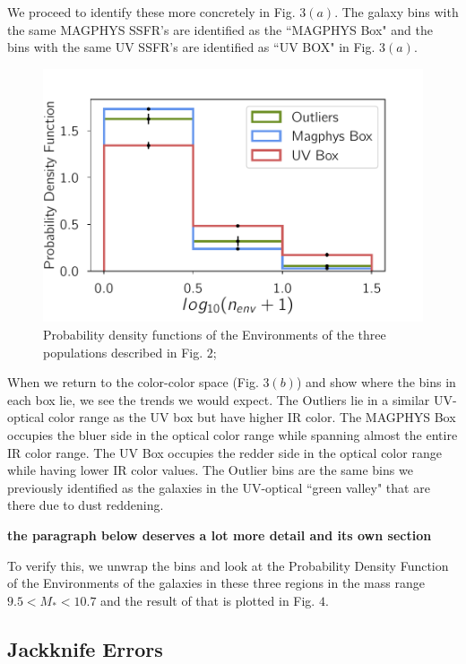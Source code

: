 \documentclass[iop]{emulateapj}
\begin{document}
We proceed to identify these more concretely in 
Fig. $3(a)$. The galaxy bins with the same MAGPHYS 
SSFR's are identified as the ``MAGPHYS Box" and 
the bins with the same UV SSFR's are identified as 
``UV BOX" in Fig. $3(a)$. \\

\begin{figure}
	\centering
		\includegraphics[width = 9 cm, height = 6.0 cm]{jk_plot.pdf}
	\caption{Probability density functions of the Environments of the three populations described in Fig. $2$; } 
\end{figure}

When we return to the color-color space (Fig. $3(b)$) and show
where the bins in each box lie,  we see the trends we would expect. 
The Outliers  lie in a similar UV-optical color range as the UV box 
but have higher IR color. The MAGPHYS Box occupies the bluer side 
in the optical color range while spanning almost the entire IR color range. 
The UV Box occupies the redder side in the optical color range while 
having lower IR color values. The Outlier bins are the 
same bins we previously identified as the galaxies in 
the UV-optical ``green valley" that are there due to dust reddening. 

\textbf{the paragraph below deserves a lot more detail and its own section}

To verify this, we unwrap the bins and look at the Probability 
Density Function of the Environments of the galaxies in these three regions in the mass range  $ 9.5 < M_{*} < 10.7$ and the result of that is plotted in Fig. $4$.

\subsection{Jackknife Errors}
\end{document}
